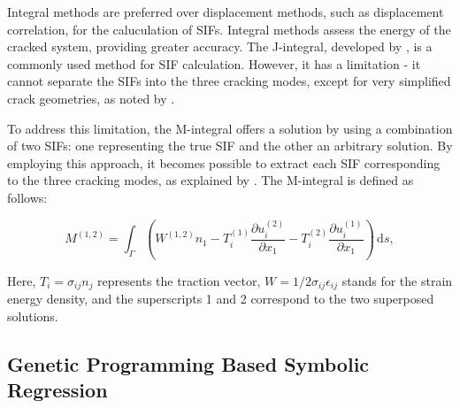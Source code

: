 Integral methods are preferred over displacement methods, such as displacement correlation, for the caluculation of SIFs. Integral methods assess the energy of the cracked system, providing greater accuracy. The J-integral, developed by \cite{Rice1968}, is a commonly used method for SIF calculation. However, it has a limitation - it cannot separate the SIFs into the three cracking modes, except for very simplified crack geometries, as noted by \cite{Banks-Sills2005}.

To address this limitation, the M-integral offers a solution by using a combination of two SIFs: one representing the true SIF and the other an arbitrary solution. By employing this approach, it becomes possible to extract each SIF corresponding to the three cracking modes, as explained by \cite{Banks-Sills2005}. The M-integral is defined as follows:

\begin{equation}\label{eqn:M-Integral}
    M^{(1, 2)} = \int_\Gamma \left(W^{(1,2)}n_1 - T^{(1)}_i \frac{\partial u^{(2)}_i}{\partial x_1} - T^{(2)}_i \frac{\partial u^{(1)}_i}{\partial x_1} \right) \, \text{d}s,
\end{equation}

Here, $T_i = \sigma_{ij} n_j$ represents the traction vector, $W = 1/2 \sigma_{ij} \epsilon_{ij}$ stands for the strain energy density, and the superscripts 1 and 2 correspond to the two superposed solutions.


\subsection{Genetic Programming Based Symbolic Regression}

